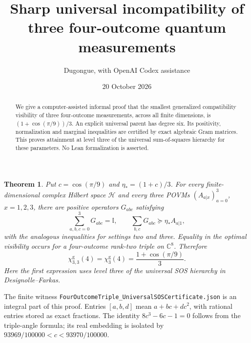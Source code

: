 \documentclass[11pt]{article}
\title{Sharp universal incompatibility of three four-outcome quantum measurements}
\author{Dugongue, with OpenAI Codex assistance}
\date{20 October 2026}
\newtheorem{theorem}{Theorem}
\newcommand{\Id}{\mathbb I}
\begin{document}
\maketitle
\begin{abstract}
We give a computer-assisted informal proof that the smallest generalized compatibility visibility of three four-outcome measurements, across all finite dimensions, is $(1+\cos(\pi/9))/3$. An explicit universal parent has degree six. Its positivity, normalization and marginal inequalities are certified by exact algebraic Gram matrices. This proves attainment at level three of the universal sum-of-squares hierarchy for these parameters. No Lean formalization is asserted.
\end{abstract}

\begin{theorem}
Put $c=\cos(\pi/9)$ and $\eta_*=(1+c)/3$. For every finite-dimensional complex Hilbert space $\mathcal H$ and every three POVMs $(A_{a|x})_{a=0}^3$, $x=1,2,3$, there are positive operators $G_{abc}$ satisfying
\[
 \sum_{a,b,c=0}^3G_{abc}=\Id,\qquad
 \sum_{b,c}G_{abc}\succeq\eta_*A_{a|1},
\]
with the analogous inequalities for settings two and three. Equality in the optimal visibility occurs for a four-outcome rank-two triple on $\mathbb C^8$. Therefore
\[
 \chi^{\mathrm g}_{3,3}(4)=\chi^{\mathrm g}_3(4)
 =\frac{1+\cos(\pi/9)}3.
\]
Here the first expression uses level three of the universal SOS hierarchy in Designolle--Farkas.
\end{theorem}

The finite witness \texttt{FourOutcomeTriple\_UniversalSOSCertificate.json} is an integral part of this proof. Entries $[a,b,d]$ mean $a+bc+dc^2$, with rational entries stored as exact fractions. The identity $8c^3-6c-1=0$ follows from the triple-angle formula; its real embedding is isolated by $93969/100000<c<93970/100000$.
\end{document}
